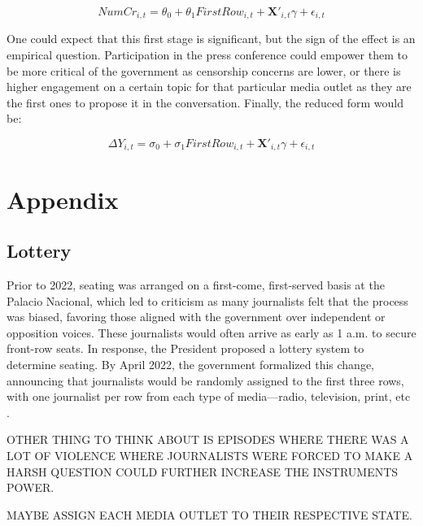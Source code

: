 \documentclass[14]{article}
\begin{document}
$$NumCr_{i, t} = \theta_0 + \theta_1 FirstRow_{i, t} + \mathbf{X'}_{i,t}\gamma + \epsilon_{i, t}$$

One could expect that this first stage is significant, but the sign of the effect is an empirical question. Participation in the press conference could empower them to be more critical of the government as censorship concerns are lower, or there is higher engagement on a certain topic for that particular media outlet as they are the first ones to propose it in the conversation. Finally, the reduced form would be:  

$$\Delta Y_{i, t} = \sigma_0 + \sigma_1 FirstRow_{i, t} + \mathbf{X'}_{i,t}\gamma + \epsilon_{i, t}$$


\clearpage

\typeout{}




\clearpage

\section{Appendix}

\subsection{Lottery}
\label{app:lottery}

Prior to 2022, seating was arranged on a first-come, first-served basis at the Palacio Nacional, which led to criticism as many journalists felt that the process was biased, favoring those aligned with the government over independent or opposition voices\citep{Tombola-Razon}. These journalists would often arrive as early as 1 a.m. to secure front-row seats. In response, the President proposed a lottery system to determine seating. By April 2022, the government formalized this change, announcing that journalists would be randomly assigned to the first three rows, with one journalist per row from each type of media—radio, television, print, etc \citep{Tombola-Financiero}. 

OTHER THING TO THINK ABOUT IS EPISODES WHERE THERE WAS A LOT OF VIOLENCE WHERE JOURNALISTS WERE FORCED TO MAKE A HARSH QUESTION COULD FURTHER INCREASE THE INSTRUMENTS POWER.

MAYBE ASSIGN EACH MEDIA OUTLET TO THEIR RESPECTIVE STATE.
\end{document}
